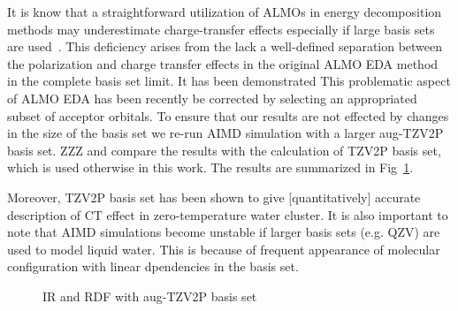 \documentclass[aps,prl,reprint,amsmath,amssymb]{revtex4-1}
\begin{document}
It is know that a straightforward utilization of ALMOs in energy decomposition methods may underestimate charge-transfer effects especially if large basis sets are used~\cite{horn2015polarization,herbert2016}. 
This deficiency arises from the lack a well-defined separation between the polarization and charge transfer effects in the original ALMO EDA method~\cite{khaliullin2007unravelling} in the complete basis set limit. 
It has been demonstrated This problematic aspect of ALMO EDA has been recently be corrected by selecting an appropriated subset of acceptor orbitals\cite{horn2015polarization}. 
To ensure that our results are not effected by changes in the size of the basis set we re-run AIMD simulation with a larger aug-TZV2P basis set. 
ZZZ and compare the results with the calculation of TZV2P basis set, which is used otherwise in this work. 
The results are summarized in Fig~\ref{Fig:basis}.

Moreover, TZV2P basis set has been shown to give [quantitatively] accurate description of CT effect in zero-temperature water cluster. 
It is also important to note that AIMD simulations become unstable if larger basis sets (e.g. QZV) are used to model liquid water. 
This is because of frequent appearance of molecular configuration with linear dpendencies in the basis set.

\begin{figure}
\caption{IR and RDF with aug-TZV2P basis set}\label{Fig:basis}
\end{figure} 


\fi %
\end{document}
